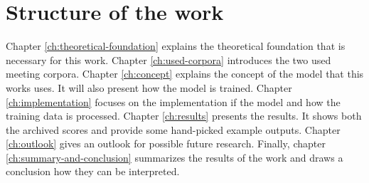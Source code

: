 
\section{Structure of the work}

Chapter \ref{ch:theoretical-foundation} explains the theoretical foundation that is necessary for this work.
Chapter \ref{ch:used-corpora} introduces the two used meeting corpora.
Chapter \ref{ch:concept} explains the concept of the model that this works uses.
It will also present how the model is trained.
Chapter \ref{ch:implementation} focuses on the implementation if the model and how the training data is processed.
Chapter \ref{ch:results} presents the results. It shows both the archived scores and provide some hand-picked example outputs.
Chapter \ref{ch:outlook} gives an outlook for possible future research.
Finally, chapter \ref{ch:summary-and-conclusion} summarizes the results of the work and draws a conclusion how they can be interpreted.
